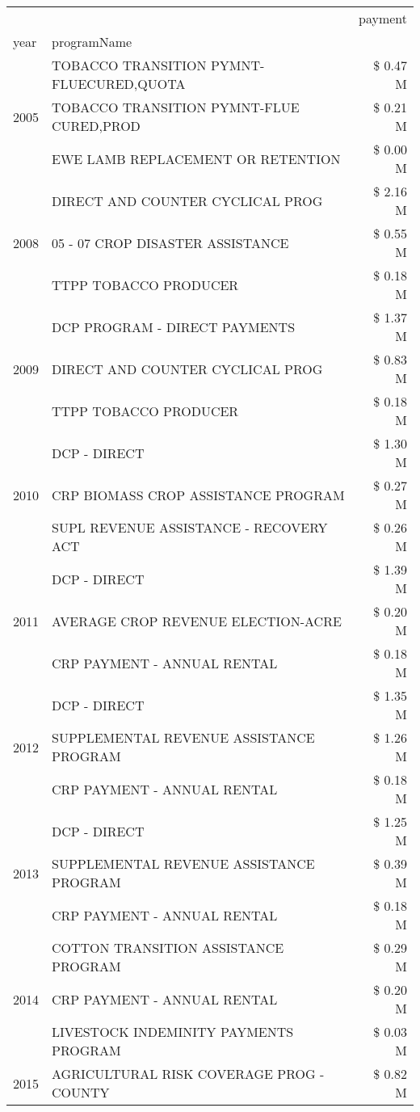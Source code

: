 \begin{tabular}{llr}
\toprule
 &  & payment \\
year & programName &  \\
\midrule
\multirow[t]{3}{*}{2005} & TOBACCO TRANSITION PYMNT-FLUECURED,QUOTA & \$ 0.47 M \\
 & TOBACCO TRANSITION PYMNT-FLUE CURED,PROD & \$ 0.21 M \\
 & EWE LAMB REPLACEMENT OR RETENTION & \$ 0.00 M \\
\cline{1-3}
\multirow[t]{3}{*}{2008} & DIRECT AND COUNTER CYCLICAL PROG & \$ 2.16 M \\
 & 05 - 07 CROP DISASTER ASSISTANCE & \$ 0.55 M \\
 & TTPP TOBACCO PRODUCER & \$ 0.18 M \\
\cline{1-3}
\multirow[t]{3}{*}{2009} & DCP PROGRAM - DIRECT PAYMENTS & \$ 1.37 M \\
 & DIRECT AND COUNTER CYCLICAL PROG & \$ 0.83 M \\
 & TTPP TOBACCO PRODUCER & \$ 0.18 M \\
\cline{1-3}
\multirow[t]{3}{*}{2010} & DCP - DIRECT & \$ 1.30 M \\
 & CRP BIOMASS CROP ASSISTANCE PROGRAM & \$ 0.27 M \\
 & SUPL REVENUE ASSISTANCE - RECOVERY ACT & \$ 0.26 M \\
\cline{1-3}
\multirow[t]{3}{*}{2011} & DCP - DIRECT & \$ 1.39 M \\
 & AVERAGE CROP REVENUE ELECTION-ACRE & \$ 0.20 M \\
 & CRP PAYMENT - ANNUAL RENTAL & \$ 0.18 M \\
\cline{1-3}
\multirow[t]{3}{*}{2012} & DCP - DIRECT & \$ 1.35 M \\
 & SUPPLEMENTAL REVENUE ASSISTANCE PROGRAM & \$ 1.26 M \\
 & CRP PAYMENT - ANNUAL RENTAL & \$ 0.18 M \\
\cline{1-3}
\multirow[t]{3}{*}{2013} & DCP - DIRECT & \$ 1.25 M \\
 & SUPPLEMENTAL REVENUE ASSISTANCE PROGRAM & \$ 0.39 M \\
 & CRP PAYMENT - ANNUAL RENTAL & \$ 0.18 M \\
\cline{1-3}
\multirow[t]{3}{*}{2014} & COTTON TRANSITION ASSISTANCE PROGRAM & \$ 0.29 M \\
 & CRP PAYMENT - ANNUAL RENTAL & \$ 0.20 M \\
 & LIVESTOCK INDEMINITY PAYMENTS PROGRAM & \$ 0.03 M \\
\cline{1-3}
\multirow[t]{3}{*}{2015} & AGRICULTURAL RISK COVERAGE PROG - COUNTY & \$ 0.82 M \\

\end{tabular}
